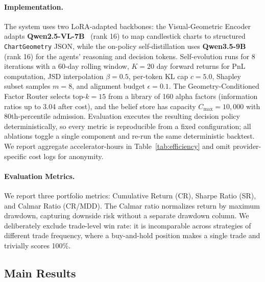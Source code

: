 \paragraph{Implementation.} The system uses two LoRA-adapted backbones: the Visual-Geometric Encoder adapts \textbf{Qwen2.5-VL-7B}~\cite{qwen25vl2024} (rank 16) to map candlestick charts to structured \texttt{ChartGeometry} JSON, while the on-policy self-distillation uses \textbf{Qwen3.5-9B}~\cite{qwen35_2026} (rank 16) for the agents' reasoning and decision tokens. Self-evolution runs for 8 iterations with a 60-day rolling window, $K{=}20$ day forward returns for PnL computation, JSD interpolation $\beta{=}0.5$, per-token KL cap $c{=}5.0$, Shapley subset samples $m{=}8$, and alignment budget $\epsilon{=}0.1$. The Geometry-Conditioned Factor Router selects top-$k{=}15$ from a library of 160 alpha factors (information ratios up to 3.04 after cost), and the belief store has capacity $C_{\max}{=}10{,}000$ with 80th-percentile admission. Evaluation executes the resulting decision policy deterministically, so every metric is reproducible from a fixed configuration; all ablations toggle a single component and re-run the same deterministic backtest. We report aggregate accelerator-hours in Table~\ref{tab:efficiency} and omit provider-specific cost logs for anonymity.


\paragraph{Evaluation Metrics.} We report three portfolio metrics: Cumulative Return (CR), Sharpe Ratio (SR), and Calmar Ratio (CR/MDD). The Calmar ratio normalizes return by maximum drawdown, capturing downside risk without a separate drawdown column. We deliberately exclude trade-level win rate: it is incomparable across strategies of different trade frequency, where a buy-and-hold position makes a single trade and trivially scores 100\%.

\subsection{Main Results}



